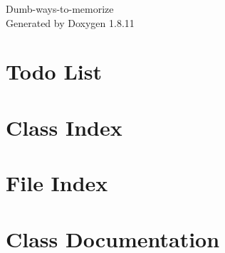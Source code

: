 \documentclass[twoside]{book}
\newcommand{\+}{\discretionary{\mbox{\scriptsize$\hookleftarrow$}}{}{}}
\newcommand{\clearemptydoublepage}{%
  \newpage{\pagestyle{empty}\cleardoublepage}%
}
\begin{document}
\hypersetup{pageanchor=false,
             bookmarksnumbered=true,
             pdfencoding=unicode
            }
\begin{titlepage}
\vspace*{7cm}
\begin{center}%
{\Large Dumb-\/ways-\/to-\/memorize }\\
\vspace*{1cm}
{\large Generated by Doxygen 1.8.11}\\
\end{center}
\end{titlepage}
\clearemptydoublepage
\tableofcontents
\clearemptydoublepage
{}
\hypersetup{pageanchor=true}

\chapter{Todo List}
\label{todo}
\hypertarget{todo}{}

\chapter{Class Index}

\chapter{File Index}

\chapter{Class Documentation}














\end{document}
